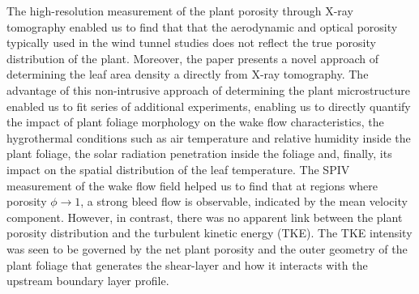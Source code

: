 The high-resolution measurement of the plant porosity through X-ray tomography enabled us to find that that the aerodynamic and optical porosity typically used in the wind tunnel studies does not reflect the true porosity distribution of the plant. Moreover, the paper presents a novel approach of determining the leaf area density a directly from X-ray tomography. The advantage of this non-intrusive approach of determining the plant microstructure enabled us to fit series of additional experiments, enabling us to directly quantify the impact of plant foliage morphology on the wake flow characteristics, the hygrothermal conditions such as air temperature and relative humidity inside the plant foliage, the solar radiation penetration inside the foliage and, finally, its impact on the spatial distribution of the leaf temperature. The SPIV measurement of the wake flow field helped us to find that at regions where porosity $\phi\rightarrow 1$, a strong bleed flow is observable, indicated by the mean velocity component. However, in contrast, there was no apparent link between the plant porosity distribution and the turbulent kinetic energy (TKE). The TKE intensity was seen to be governed by the net plant porosity and the outer geometry of the plant foliage that generates the shear-layer and how it interacts with the upstream boundary layer profile.

